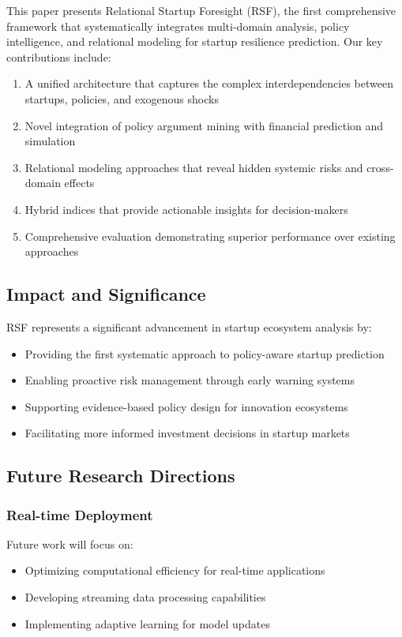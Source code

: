 This paper presents Relational Startup Foresight (RSF), the first comprehensive framework that systematically integrates multi-domain analysis, policy intelligence, and relational modeling for startup resilience prediction. Our key contributions include:

\begin{enumerate}
    \item A unified architecture that captures the complex interdependencies between startups, policies, and exogenous shocks
    \item Novel integration of policy argument mining with financial prediction and simulation
    \item Relational modeling approaches that reveal hidden systemic risks and cross-domain effects
    \item Hybrid indices that provide actionable insights for decision-makers
    \item Comprehensive evaluation demonstrating superior performance over existing approaches
\end{enumerate}

\subsection{Impact and Significance}

RSF represents a significant advancement in startup ecosystem analysis by:
\begin{itemize}
    \item Providing the first systematic approach to policy-aware startup prediction
    \item Enabling proactive risk management through early warning systems
    \item Supporting evidence-based policy design for innovation ecosystems
    \item Facilitating more informed investment decisions in startup markets
\end{itemize}

\subsection{Future Research Directions}

\subsubsection{Real-time Deployment}
Future work will focus on:
\begin{itemize}
    \item Optimizing computational efficiency for real-time applications
    \item Developing streaming data processing capabilities
    \item Implementing adaptive learning for model updates
\end{itemize}

